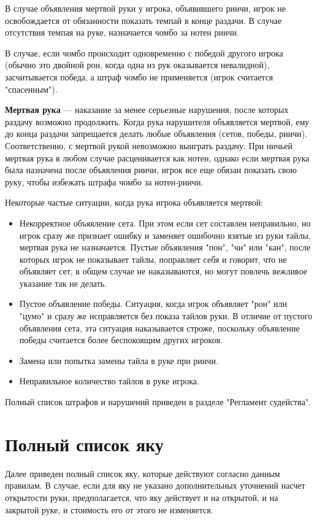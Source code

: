 В случае объявления мертвой руки у игрока, объявившего риичи, игрок не освобождается от обязанности показать темпай в конце раздачи. В случае отсутствия темпая на руке, назначается чомбо за нотен риичи. 

В случае, если чомбо происходит одновременно с победой другого игрока (обычно это двойной рон, когда одна из рук оказывается невалидной), засчитывается победа, а штраф чомбо не применяется (игрок считается "спасенным").

\textbf{Мертвая рука} --- наказание за менее серьезные нарушения, после которых раздачу возможно продолжить. Когда рука нарушителя объявляется мертвой, ему до конца раздачи запрещается делать любые объявления (сетов, победы, риичи). Соответственно, с мертвой рукой невозможно выиграть раздачу. При ничьей мертвая рука в любом случае расценивается как нотен, однако если мертвая рука была назначена после объявления риичи, игрок все еще обязан показать свою руку, чтобы избежать штрафа чомбо за нотен-риичи.

Некоторые частые ситуации, когда рука игрока объявляется мертвой:
\begin{itemize}
	\item Некорректное объявление сета. При этом если сет составлен неправильно, но игрок сразу же признает ошибку и заменяет ошибочно взятые из руки тайлы, мертвая рука не назначается. Пустые объявления "пон", "чи" или "кан", после которых игрок не показывает тайлы, поправляет себя и говорит, что не объявляет сет, в общем случае не наказываются, но могут повлечь вежливое указание так не делать.
	\item Пустое объявление победы. Ситуация, когда игрок объявляет "рон" или "цумо" и сразу же исправляется без показа тайлов руки. В отличие от пустого объявления сета, эта ситуация наказывается строже, поскольку объявление победы считается более беспокоящим других игроков.
	\item Замена или попытка замены тайла в руке при риичи.
	\item Неправильное количество тайлов в руке игрока.
\end{itemize}

Полный список штрафов и нарушений приведен в разделе "Регламент судейства".

\section{Полный список яку}

Далее приведен полный список яку, которые действуют согласно данным правилам. В случае, если для яку не указано дополнительных уточнений насчет открытости руки, предполагается, что яку действует и на открытой, и на закрытой руке, и стоимость его от этого не изменяется.

